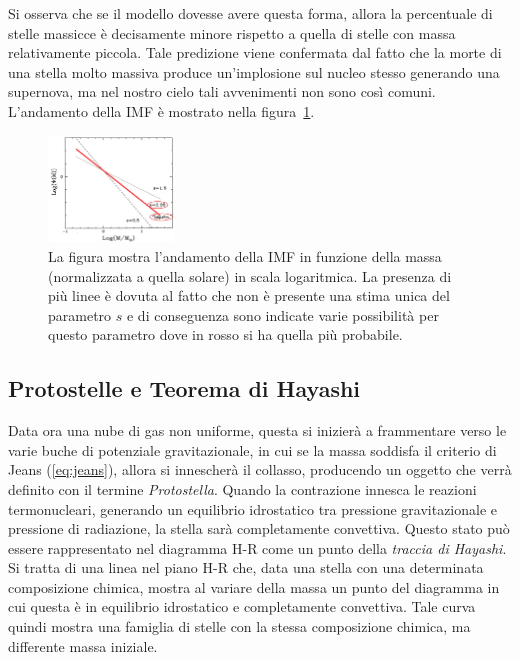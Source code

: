 Si osserva che se il modello dovesse avere questa forma, allora la percentuale di stelle massicce è decisamente minore rispetto a quella di stelle con massa relativamente piccola. Tale predizione viene confermata dal fatto che la morte di una stella molto massiva produce un'implosione sul nucleo stesso generando una supernova, ma nel nostro cielo tali avvenimenti non sono così comuni. L'andamento della IMF è mostrato nella figura~\ref{fig:IMF}.

\begin{figure}
    \centering
    \includegraphics[width = 0.3\textwidth]{immagini/IMF.png}
    \caption{La figura mostra l'andamento della IMF in funzione della massa (normalizzata a quella solare) in scala logaritmica. La presenza di più linee è dovuta al fatto che non è presente una stima unica del parametro $s$ e di conseguenza sono indicate varie possibilità per questo parametro dove in rosso si ha quella più probabile.}\label{fig:IMF}
\end{figure}
\subsection{Protostelle e Teorema di Hayashi}

Data ora una nube di gas non uniforme, questa si inizierà a frammentare verso le varie buche di potenziale gravitazionale, in cui se la massa  soddisfa il criterio di Jeans (\ref{eq:jeans}), allora si innescherà il collasso, producendo un oggetto che verrà definito con il termine \textit{Protostella}. Quando la contrazione innesca le reazioni termonucleari, generando un equilibrio idrostatico tra pressione gravitazionale e pressione di radiazione, la stella sarà completamente convettiva. Questo stato può essere rappresentato nel diagramma H-R come un punto della \textit{traccia di Hayashi}. Si tratta di una linea nel piano H-R che, data una stella con una determinata composizione chimica, mostra al variare della massa un punto del diagramma in cui questa è in equilibrio idrostatico e completamente convettiva. Tale curva quindi mostra una famiglia di stelle con la stessa composizione chimica, ma differente massa iniziale.

